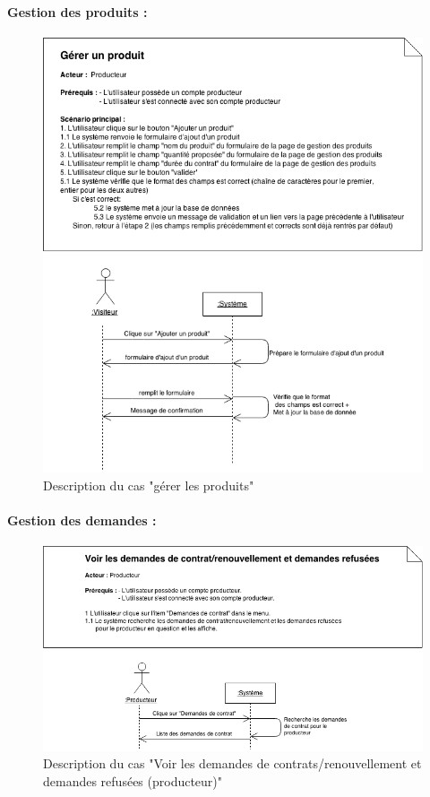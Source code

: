 \documentclass[12pt]{report}
\begin{document}
\paragraph*{Gestion des produits :}
\begin{figure}[!h]
\centering
\includegraphics[width=1.\textwidth]{./ressources/desc_UC_gerer_produit.png}
\caption{Description du cas "gérer les produits"}
\end{figure}
\clearpage

\paragraph*{Gestion des demandes :}
\begin{figure}[!h]
\centering
\includegraphics[width=1.\textwidth]{./ressources/desc_UC_voir_demandes_prod.png}
\caption{Description du cas "Voir les demandes de contrats/renouvellement et demandes refusées (producteur)"}
\end{figure}
\clearpage
\end{document}
